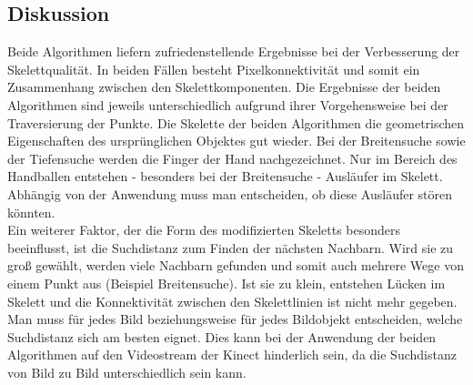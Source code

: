 \subsection{Diskussion}
Beide Algorithmen liefern zufriedenstellende Ergebnisse bei der Verbesserung der Skelettqualität. In beiden
Fällen besteht Pixelkonnektivität und somit ein Zusammenhang zwischen den Skelettkomponenten. Die Ergebnisse
der beiden Algorithmen sind jeweils unterschiedlich aufgrund ihrer Vorgehensweise bei der Traversierung der Punkte. Die Skelette der beiden Algorithmen die geometrischen Eigenschaften des ursprünglichen Objektes gut wieder. Bei der Breitensuche sowie der Tiefensuche werden die Finger der Hand
nachgezeichnet. Nur im Bereich des Handballen entstehen - besonders bei der Breitensuche - Ausläufer im Skelett. Abhängig von der Anwendung muss man entscheiden, ob diese Ausläufer stören könnten.\\
Ein weiterer Faktor, der die Form des modifizierten Skeletts besonders beeinflusst, ist die Suchdistanz zum
Finden der nächsten Nachbarn. Wird sie zu groß gewählt, werden viele Nachbarn gefunden und somit auch
mehrere Wege von einem Punkt aus (Beispiel Breitensuche). Ist sie zu klein, entstehen Lücken im Skelett
und die Konnektivität zwischen den Skelettlinien ist nicht mehr gegeben. Man muss für jedes Bild beziehungsweise für jedes Bildobjekt entscheiden, welche Suchdistanz sich am besten eignet. Dies kann
bei der Anwendung der beiden Algorithmen auf den Videostream der Kinect hinderlich sein, da die Suchdistanz von Bild zu Bild unterschiedlich sein kann.  